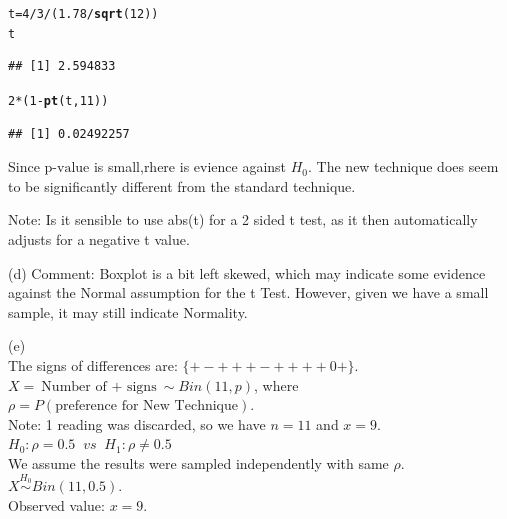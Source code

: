 \documentclass[bigtut]{tutorial}\usepackage[]{graphicx}\usepackage[]{color}
\makeatletter
\newcommand{\hlnum}[1]{\textcolor[rgb]{0.686,0.059,0.569}{#1}}%
\newcommand{\hlopt}[1]{\textcolor[rgb]{0,0,0}{#1}}%
\newcommand{\hlstd}[1]{\textcolor[rgb]{0.345,0.345,0.345}{#1}}%
\newcommand{\hlkwb}[1]{\textcolor[rgb]{0.69,0.353,0.396}{#1}}%
\newcommand{\hlkwd}[1]{\textcolor[rgb]{0.737,0.353,0.396}{\textbf{#1}}}%
\newenvironment{kframe}{%
 \def\at@end@of@kframe{}%
 \ifinner\ifhmode%
  \def\at@end@of@kframe{\end{minipage}}%
  \begin{minipage}{\columnwidth}%
 \fi\fi%
 \def\FrameCommand##1{\hskip\@totalleftmargin \hskip-\fboxsep
 \colorbox{shadecolor}{##1}\hskip-\fboxsep
     \hskip-\linewidth \hskip-\@totalleftmargin \hskip\columnwidth}%
 \MakeFramed {\advance\hsize-\width
   \@totalleftmargin\z@ \linewidth\hsize
   \@setminipage}}%
 {\par\unskip\endMakeFramed%
 \at@end@of@kframe}
\newenvironment{knitrout}{}{} %
\makeatother
\begin{document}
\begin{tutorial}
\begin{questions}
\begin{solution}
\begin{knitrout}
\color{fgcolor}\begin{kframe}
\begin{alltt}
\hlstd{t}\hlkwb{=}\hlnum{4}\hlopt{/}\hlnum{3}\hlopt{/}\hlstd{(}\hlnum{1.78}\hlopt{/}\hlkwd{sqrt}\hlstd{(}\hlnum{12}\hlstd{))}
\hlstd{t}
\end{alltt}
\begin{verbatim}
## [1] 2.594833
\end{verbatim}
\begin{alltt}
\hlnum{2}\hlopt{*}\hlstd{(}\hlnum{1}\hlopt{-} \hlkwd{pt}\hlstd{(t,}\hlnum{11}\hlstd{))}
\end{alltt}
\begin{verbatim}
## [1] 0.02492257
\end{verbatim}
\end{kframe}
\end{knitrout}

\vspace{.5cm}
Since $\text{p-value}$ is small,rhere is evience against $H_{0}$.
The new technique does seem to be significantly different from the standard technique.

Note: Is it sensible to use abs(t) for a 2 sided t test, as it then automatically adjusts for a negative t value.

\vspace{.5cm}
(d)  Comment: Boxplot is a bit left skewed, which may indicate some evidence against the Normal assumption for the t Test. However, given we have a small sample, it may still indicate Normality.


(e) 
 \\
The signs of differences are: 
$\{ + - + + + - + + + + 0 + \}$. \\

$X = \text{Number of $+$ signs} \sim Bin(11, p)$, where $\rho = P(\text{preference for New Technique})$. \\
Note: 1 reading was discarded, so we have $n= 11$ and $x=9$. \\

$H_0: \rho=0.5  \;\; vs \;\; H_1: \rho \neq 0.5$ \\

 We assume the results were sampled independently with same $\rho$. \\

$X \overset{H_0}{\sim} Bin(11,0.5)$.\\
Observed value: $x=9$. \\


\end{solution}
\end{questions}
\end{tutorial}
\end{document}
